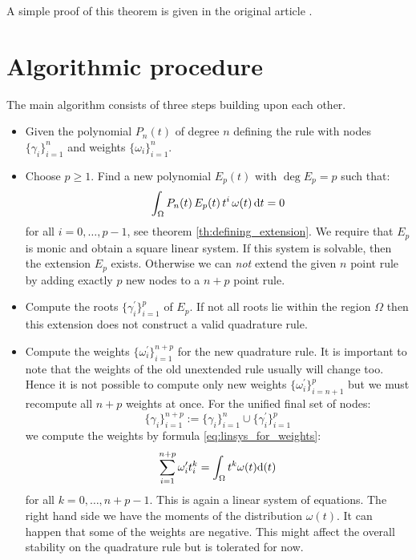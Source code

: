 \documentclass[a4paper,10pt]{article}
\begin{document}
A simple proof of this theorem is given in the original article \cite{mehrotra-papp}.


\section{Algorithmic procedure}

The main algorithm consists of three steps building upon each other.

\begin{itemize}
  \item Given the polynomial $P_n(t)$ of degree $n$ defining the rule
    with nodes $\{\gamma_i\}_{i=1}^{n}$ and weights $\{\omega_i\}_{i=1}^{n}$.
  \item Choose $p \geq 1$.
    Find a new polynomial $E_p(t)$ with $\deg E_p = p$ such that:
    \begin{equation}
      \int_{\Omega} P_n(t) \, E_p(t) \, t^i \, \omega(t) \, \mathrm{d}t = 0
    \end{equation}
    for all $i = 0, \ldots, p-1$, see theorem \ref{th:defining_extension}.
    We require that $E_p$ is monic and obtain a square linear system.
    If this system is solvable, then the extension $E_p$ exists.
    Otherwise we can \emph{not} extend the given $n$ point rule by
    adding exactly $p$ new nodes to a $n+p$ point rule.
  \item Compute the roots $\{\gamma^\prime_i\}_{i=1}^{p}$ of $E_p$.
    If not all roots lie within the region $\Omega$ then this extension
    does not construct a valid quadrature rule.
  \item Compute the weights $\{\omega^\prime_i\}_{i=1}^{n+p}$ for the new
    quadrature rule. It is important to note that the weights of the old
    unextended rule usually will change too. Hence it is not possible to
    compute only new weights $\{\omega^\prime_i\}_{i=n+1}^{p}$ but we must
    recompute all $n+p$ weights at once. For the unified final set of nodes:
    \begin{equation}
      \{\gamma_i\}_{i=1}^{n+p} := \{\gamma_i\}_{i=1}^{n} \cup \{\gamma^\prime_i\}_{i=1}^{p}
    \end{equation}
    we compute the weights by formula \eqref{eq:linsys_for_weights}:
    \begin{equation}
      \sum_{i=1}^{n+p} \omega^\prime_i t_i^k = \int_{\Omega} t^k \omega(t) \mathrm{d}(t)
    \end{equation}
    for all $k=0, \ldots, n+p-1$. This is again a linear system
    of equations. The right hand side we have the moments of the
    distribution $\omega(t)$. It can happen that some of the weights
    are negative. This might affect the overall stability on the quadrature
    rule but is tolerated for now.
\end{itemize}
\end{document}
